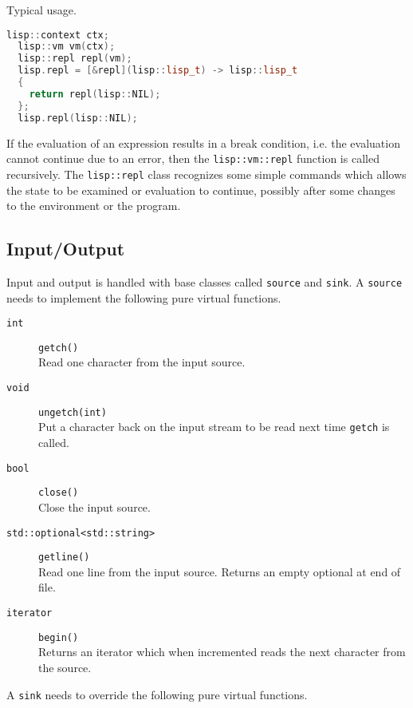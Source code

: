 \documentclass[a4paper]{article}
\newcommand{\cpp}[1]{\texttt{#1}}
\begin{document}
Typical usage.

\begin{lstlisting}[language=c++]
  lisp::context ctx;
  lisp::vm vm(ctx);
  lisp::repl repl(vm);
  lisp.repl = [&repl](lisp::lisp_t) -> lisp::lisp_t
  {
    return repl(lisp::NIL);
  };
  lisp.repl(lisp::NIL);
\end{lstlisting}

If the evaluation of an expression results in a break condition,
i.e. the evaluation cannot continue due to an error, then the
\cpp{lisp::vm::repl} function is called recursively. The
\cpp{lisp::repl} class recognizes some simple commands which allows
the state to be examined or evaluation to continue, possibly after
some changes to the environment or the program.

\subsection{Input/Output}
Input and output is handled with base classes called \cpp{source} and
\cpp{sink}. A \cpp{source} needs to implement the following pure
virtual functions.

\begin{description}
  \item[\cpp{int}] \cpp{getch()} \\ Read one character from the input source.
  \item[\cpp{void}] \cpp{ungetch(int)} \\ Put a character back on the input
    stream to be read next time \cpp{getch} is called.
  \item[\cpp{bool}] \cpp{close()} \\ Close the input source.
  \item[\cpp{std::optional<std::string>}] \cpp{getline()} \\ Read one line
    from the input source. Returns an empty optional at end of file.
  \item[\cpp{iterator}] \cpp{begin()} \\ Returns an iterator which when
    incremented reads the next character from the source.
\end{description}

A \cpp{sink} needs to override the following pure virtual functions.
\end{document}
